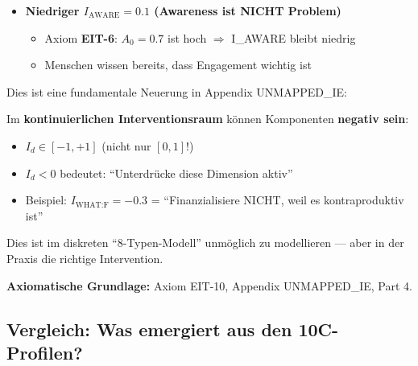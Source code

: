 \begin{itemize}[nosep]
\item \textbf{Niedriger $I_{\text{AWARE}} = 0.1$ (Awareness ist NICHT Problem)}
  \begin{itemize}[nosep]
  \item Axiom \textbf{EIT-6}: $A_0 = 0.7$ ist hoch $\Rightarrow$ I_AWARE bleibt niedrig
  \item Menschen wissen bereits, dass Engagement wichtig ist
  \end{itemize}
\end{itemize}

\begin{tcolorbox}[colback=red!5!white, colframe=red!75!black,
    title=\textbf{DURCHBRUCH: Negative Interventionskomponenten (EIT-10)}]

Dies ist eine fundamentale Neuerung in Appendix UNMAPPED_IE:

Im \textbf{kontinuierlichen Interventionsraum} können Komponenten \textbf{negativ sein}:
\begin{itemize}[nosep]
\item $I_d \in [-1, +1]$ (nicht nur $[0, 1]$!)
\item $I_d < 0$ bedeutet: ``Unterdrücke diese Dimension aktiv''
\item Beispiel: $I_{\text{WHAT:F}} = -0.3$ = ``Finanzialisiere NICHT, weil es kontraproduktiv ist''
\end{itemize}

Dies ist im diskreten ``8-Typen-Modell'' unmöglich zu modellieren — aber in der Praxis die richtige Intervention.

\textbf{Axiomatische Grundlage:} Axiom EIT-10, Appendix UNMAPPED_IE, Part 4.

\end{tcolorbox}

\subsection{Vergleich: Was emergiert aus den 10C-Profilen?}
\label{sec:17-comparison}

